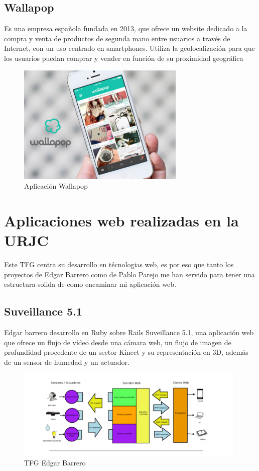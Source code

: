 \subsection{Wallapop}

Es una empresa española fundada en 2013, que ofrece un website dedicado a la compra y venta de productos de segunda mano entre usuarios a través de Internet, con un uso centrado en smartphones. Utiliza la geolocalización para que los usuarios puedan comprar y vender en función de su proximidad geográfica

\begin{figure}[H]
    \centering
    \includegraphics[width=80mm]{memoria/LaTeX/img/introduccion/Wallapop-iPhone.jpg}
    \caption{Aplicación Wallapop}
\end{figure}


\section{Aplicaciones web realizadas en la URJC}

Este TFG centra su desarrollo en técnologias web, es por eso que tanto los proyectos de Edgar Barrero como de Pablo Parejo me han servido para tener una estructura solida de como encaminar mi aplicación web.

\subsection{Suveillance 5.1}

Edgar barrero desarrollo en Ruby sobre Rails Suveillance 5.1, una aplicación web que ofrece un flujo de vídeo desde una cámara web, un flujo de imagen de profundidad procedente de un sector Kinect y su representación en 3D, además de un sensor de humedad y un actuador. 


\begin{figure}[H]
    \centering
    \includegraphics[width=110mm]{memoria/LaTeX/img/introduccion/edgar.png}
    \caption{TFG Edgar Barrero}
\end{figure}

